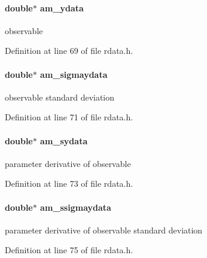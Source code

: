 \paragraph[{am\+\_\+ydata}]{\setlength{\rightskip}{0pt plus 5cm}double$\ast$ am\+\_\+ydata}\label{struct_return_data_a24568582aa8de699ea1ce53323ff26ca}
observable 

Definition at line 69 of file rdata.\+h.

\hypertarget{struct_return_data_a36512c21e11b127a3d0326ff82ed6373}{}
\paragraph[{am\+\_\+sigmaydata}]{\setlength{\rightskip}{0pt plus 5cm}double$\ast$ am\+\_\+sigmaydata}\label{struct_return_data_a36512c21e11b127a3d0326ff82ed6373}
observable standard deviation 

Definition at line 71 of file rdata.\+h.

\hypertarget{struct_return_data_ad929fcdabf8be8e21427cba880bc7ebb}{}
\paragraph[{am\+\_\+sydata}]{\setlength{\rightskip}{0pt plus 5cm}double$\ast$ am\+\_\+sydata}\label{struct_return_data_ad929fcdabf8be8e21427cba880bc7ebb}
parameter derivative of observable 

Definition at line 73 of file rdata.\+h.

\hypertarget{struct_return_data_a37d8072bd513f93263203bfad00705ff}{}
\paragraph[{am\+\_\+ssigmaydata}]{\setlength{\rightskip}{0pt plus 5cm}double$\ast$ am\+\_\+ssigmaydata}\label{struct_return_data_a37d8072bd513f93263203bfad00705ff}
parameter derivative of observable standard deviation 

Definition at line 75 of file rdata.\+h.

\hypertarget{struct_return_data_a2ebada170b4bc6a2337794e4ec08d77c}{}

